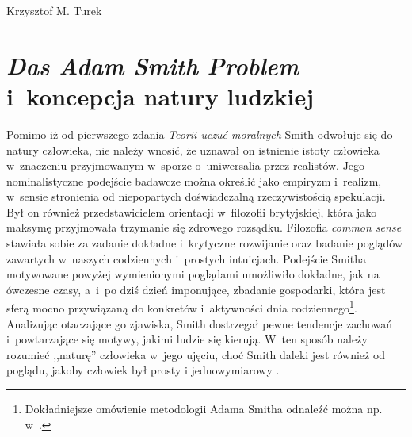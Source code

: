 \begin{artplenv}{Krzysztof M. Turek}
\section{\textit{Das Adam Smith Problem} i~koncepcja natury ludzkiej}

Pomimo iż od pierwszego zdania \textit{Teorii uczuć moralnych} Smith
\parencite*[s.~5]{smith_teoria_1989}
odwołuje się do natury
człowieka, nie należy wnosić, że uznawał on istnienie istoty człowieka w~znaczeniu
przyjmowanym w~sporze o~uniwersalia przez realistów. Jego nominalistyczne podejście
badawcze można określić jako empiryzm i~realizm, w~sensie
stronienia od niepopartych doświadczalną rzeczywistością spekulacji. Był on również przedstawicielem
orientacji w~filozofii brytyjskiej, która jako maksymę przyjmowała trzymanie się zdrowego rozsądku.
Filozofia \textit{common sense} stawiała sobie za zadanie dokładne i~krytyczne
rozwijanie oraz badanie poglądów zawartych w~naszych
codziennych i~prostych intuicjach. Podejście Smitha motywowane powyżej
wymienionymi poglądami umożliwiło dokładne, jak na ówczesne
czasy, a~i~po dziś dzień imponujące, zbadanie gospodarki, która jest sferą mocno przywiązaną do konkretów i~aktywności
dnia codziennego\footnote{Dokładniejsze omówienie metodologii Adama Smitha odnaleźć
można np. w~\parencites[rozdz.~I–III]{fleischacker_adam_2005}[rozdz.~8 i~9]{myers_soul_1983}.
}. Analizując otaczające go
zjawiska, Smith dostrzegał pewne tendencje zachowań i~powtarzające się motywy, jakimi ludzie się kierują. W~ten sposób
należy rozumieć ,,naturę'' człowieka w~jego ujęciu, choć Smith daleki jest również od poglądu, jakoby człowiek był prosty
i jednowymiarowy
\parencite{lubinski_rola_2019}.


\end{artplenv}
